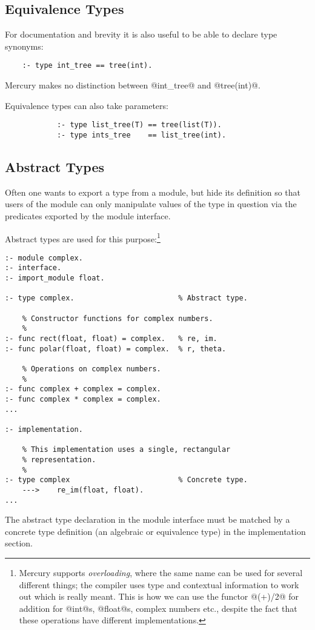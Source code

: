 \subsection{Equivalence Types}

For documentation and brevity it is also useful to be able to
declare type synonyms:
\begin{verbatim}
    :- type int_tree == tree(int).
\end{verbatim}
Mercury makes no distinction between @int_tree@ and
@tree(int)@.

Equivalence types can also take parameters:
\begin{verbatim}
            :- type list_tree(T) == tree(list(T)).
            :- type ints_tree    == list_tree(int).
\end{verbatim}

\subsection{Abstract Types}

Often one wants to export a type from a module, but hide its
definition so that users of the module can only manipulate
values of the type in question via the predicates exported by
the module interface.

Abstract types are used for this purpose:\footnote{Mercury supports \emph{overloading}, where the same name can
be used for several different things; the compiler uses type and
contextual information to work out which is really meant.  This is how
we can use the functor @(+)/2@ for addition for @int@s, @float@s,
complex numbers etc., despite the fact that these operations have
different implementations.}
\begin{verbatim}
:- module complex.
:- interface.
:- import_module float.

:- type complex.                        % Abstract type.

    % Constructor functions for complex numbers.
    %
:- func rect(float, float) = complex.   % re, im.
:- func polar(float, float) = complex.  % r, theta.

    % Operations on complex numbers.
    %
:- func complex + complex = complex.
:- func complex * complex = complex.
...

:- implementation.

    % This implementation uses a single, rectangular
    % representation.
    %
:- type complex                         % Concrete type.
    --->    re_im(float, float).
...
\end{verbatim}
The abstract type declaration in the module interface must be
matched by a concrete type definition (an algebraic or
equivalence type) in the implementation section.


